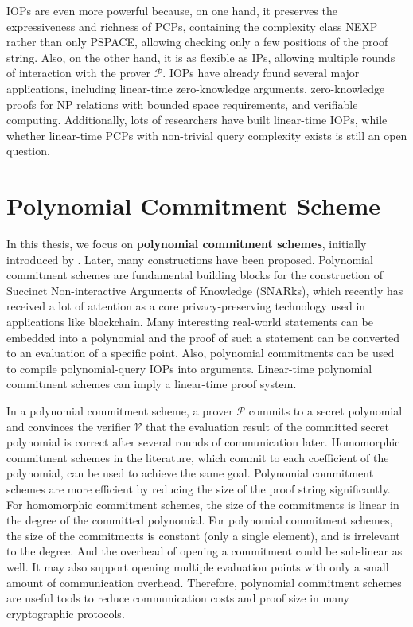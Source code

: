 IOPs are even more powerful because, on one hand, it preserves the expressiveness and richness of PCPs, containing the complexity class NEXP rather than only PSPACE, allowing checking only a few positions of the proof string. Also, on the other hand, it is as flexible as IPs, allowing multiple rounds of interaction with the prover $\mathcal{P}$. IOPs have already found several major applications, including linear-time zero-knowledge arguments, zero-knowledge proofs for NP relations with bounded space requirements, and verifiable computing.
Additionally, lots of researchers have built linear-time IOPs, while whether linear-time PCPs with non-trivial query complexity exists is still an open question.


\section{Polynomial Commitment Scheme}

In this thesis, we focus on \textbf{polynomial commitment schemes}, 
initially introduced by \cite{DBLP:conf/asiacrypt/KateZG10}.
Later, many constructions 
\cite{DBLP:conf/sp/TomescuCZAPGD20} 
\cite{DBLP:journals/iacr/YurekLFKM21} 
\cite{277222}
have been proposed.
Polynomial commitment schemes are fundamental building blocks for the construction of Succinct Non-interactive Arguments of Knowledge (SNARks), 
which recently has received a lot of attention as a core privacy-preserving technology used in applications like blockchain. Many interesting real-world statements can be embedded into a polynomial and the proof of such a statement can be converted to an evaluation of a specific point. Also, polynomial commitments can be used to compile polynomial-query IOPs into arguments. Linear-time polynomial commitment schemes can imply a linear-time proof system.

In a polynomial commitment scheme, a prover $\mathcal{P}$ commits to a secret polynomial and convinces the verifier $\mathcal{V}$ that the evaluation result of the committed secret polynomial is correct after several rounds of communication later. Homomorphic commitment schemes in the literature, which commit to each coefficient of the polynomial, can be used to achieve the same goal. Polynomial commitment schemes are more efficient by reducing the size of the proof string significantly. For homomorphic commitment schemes, the size of the commitments is linear in the degree of the committed polynomial. For polynomial commitment schemes, the size of the commitments is constant (only a single element), and is irrelevant to the degree. And the overhead of opening a commitment could be sub-linear as well. It may also support opening multiple evaluation points with only a small amount of communication overhead. Therefore, polynomial commitment schemes are useful tools to reduce communication costs and proof size in many cryptographic protocols.


